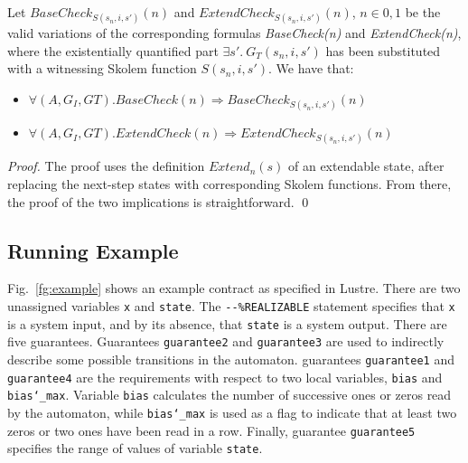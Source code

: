 \begin{theorem} Let $BaseCheck_{S(s_n,i,s')}(n)$ and
$ExtendCheck_{S(s_n,i,s')}(n)$, $n \in {0,1}$ be the valid
variations of the corresponding formulas \textit{BaseCheck(n)} and
\textit{ExtendCheck(n)}, where the existentially quantified part $\exists s'.~
G_T(s_n, i, s')$ has been substituted with a witnessing Skolem function 
$S(s_n,i,s')$.  We have that:
\begin{itemize}
\item $\forall (A,G_{I},G{T}). BaseCheck(n) \Rightarrow BaseCheck_{S(s_n,i,s')}(n)$
\item $\forall (A,G_{I},G{T}). ExtendCheck(n) \Rightarrow
ExtendCheck_{S(s_n,i,s')}(n)$
\end{itemize}
\end{theorem}
\begin{proof}
The proof uses the definition \textit{$Extend_n(s)$} of an extendable state,
after replacing the next-step states with corresponding Skolem functions. From there,
the proof of the two implications is straightforward.
\qed
\end{proof}


\subsection{Running Example} 
\label{sec:example}

Fig.~\ref{fg:example} shows an example contract as specified in
Lustre. There are two unassigned variables \texttt{x} and
\texttt{state}. The \texttt{{-}{-}\%REALIZABLE} statement specifies
that \texttt{x} is a system input, and by its absence, that
\texttt{state} is a system output. There are five guarantees.
Guarantees \texttt{guarantee2} and \texttt{guarantee3} are used to indirectly
describe some possible transitions in the automaton. guarantees
\texttt{guarantee1} and \texttt{guarantee4} are the requirements with respect to
two local variables, \texttt{bias} and \texttt{bias\char`_max}.
Variable \texttt{bias} calculates the number of successive ones or
zeros read by the automaton, while \texttt{bias\char`_max} is used as
a flag to indicate that at least two zeros or two ones have been read
in a row. Finally, guarantee \texttt{guarantee5} specifies the range of
values of variable \texttt{state}.

